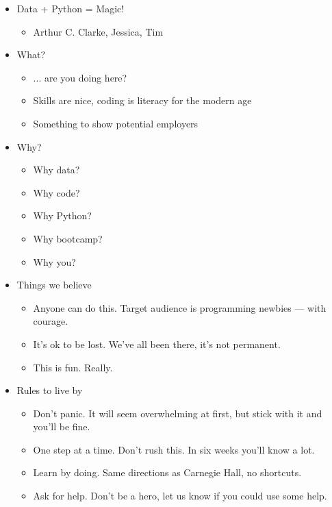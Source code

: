 \begin{itemize}
\item Data + Python = Magic!
\begin{itemize}
\item Arthur C. Clarke, Jessica, Tim
\end{itemize}

\item What?
\begin{itemize}
\item ... are you doing here?
\item Skills are nice, coding is literacy for the modern age
\item Something to show potential employers
\end{itemize}

\item Why?
\begin{itemize}
\item Why data?
\item Why code?
\item Why Python?
\item Why bootcamp?
\item Why you?
\end{itemize}

\item Things we believe
\begin{itemize}
\item Anyone can do this.  Target audience is {programming newbies --- with courage}.
\item It's ok to be lost.  We've all been there, it's not permanent.
\item This is fun.  Really.
\end{itemize}


\item Rules to live by
\begin{itemize}
\item Don't panic.  It will seem overwhelming at first, but stick with it and you'll be fine.
\item One step at a time.  Don't rush this.  In six weeks you'll know a lot.
\item Learn by doing.  Same directions as Carnegie Hall, no shortcuts.
\item Ask for help.  Don't be a hero, let us know if you could use some help.
\end{itemize}


\end{itemize}
